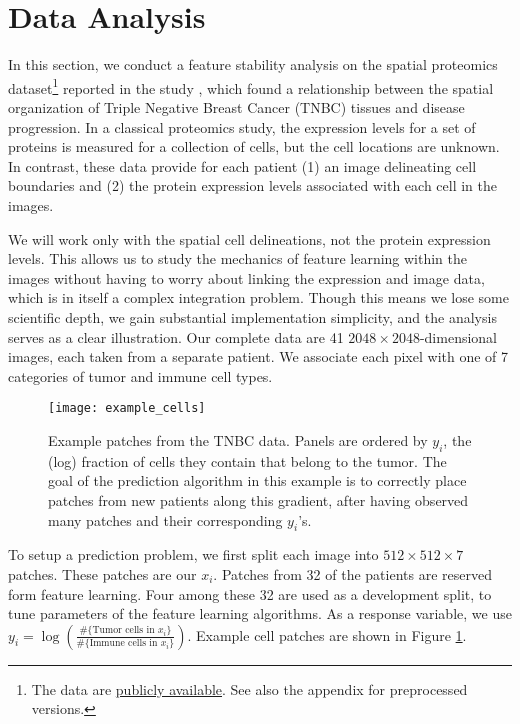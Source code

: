 
\section{Data Analysis}
\label{sec:dataset}

In this section, we conduct a feature stability analysis on the spatial
proteomics dataset\footnote{The data are
  \href{https://www.angelolab.com/mibi-data}{publicly available}. See also the
  appendix for preprocessed versions.} reported in the study
\citep{keren2018structured}, which found a relationship between the spatial
organization of Triple Negative Breast Cancer (TNBC) tissues and disease
progression. In a classical proteomics study, the expression levels for a set of
proteins is measured for a collection of cells, but the cell locations are
unknown. In contrast, these data provide for each patient (1) an image
delineating cell boundaries and (2) the protein expression levels associated
with each cell in the images.

We will work only with the spatial cell delineations, not the protein expression
levels. This allows us to study the mechanics of feature learning within the
images without having to worry about linking the expression and image data,
which is in itself a complex integration problem. Though this means we lose some
scientific depth, we gain substantial implementation simplicity, and the
analysis serves as a clear illustration. Our complete data are 41 $2048 \times
2048$-dimensional images, each taken from a separate patient. We associate each
pixel with one of 7 categories of tumor and immune cell types.

\begin{figure}
  \centering
  \texttt{[image: example\_cells]}
  \caption{Example patches from the TNBC data. Panels are ordered by $y_i$, the
    (log) fraction of cells they contain that belong to the tumor. The goal of
    the prediction algorithm in this example is to correctly place patches from
    new patients along this gradient, after having observed many patches and
    their corresponding $y_i$'s.}
  \label{fig:example_cells}
\end{figure}

To setup a prediction problem, we first split each image into $512 \times 512 \times 7$
patches. These patches are our $x_{i}$. Patches from 32 of the patients are
reserved form feature learning. Four among these 32 are used as a development
split, to tune parameters of the feature learning algorithms. As a response
variable, we use $y_{i} = \log\left(\frac{\#\{\text{Tumor cells in
  }x_{i}\}}{\#\{\text{Immune cells in }x_i\}}\right)$. Example cell patches are
shown in Figure \ref{fig:example_cells}.

